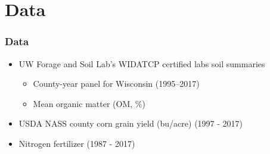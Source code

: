\documentclass[xcolor = x11names, compress, aspectratio = 169]{beamer}
\renewcommand{\(}{\begin{columns}}
\renewcommand{\)}{\end{columns}}
\newcommand{\<}[1]{\begin{column}{#1}}
\renewcommand{\>}{\end{column}}
\begin{document}
\section{Data}
    \begin{frame}
    \frametitle{Data}
    \begin{itemize}
        \item UW Forage and Soil Lab's WIDATCP certified labs soil summaries
        \begin{itemize}
            \item County-year panel for Wisconsin (1995--2017)
            \item Mean organic matter (OM, \%)
        \end{itemize}
        \item USDA NASS county corn grain yield (bu/acre) (1997 - 2017)
        \item Nitrogen fertilizer (1987 - 2017)
    \end{itemize}
    \end{frame}
\end{document}
